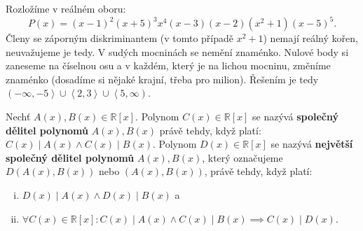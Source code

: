 \begin{reseni}
Rozložíme v reálném oboru:
\begin{equation*}
P(x)=(x-1)^2(x+5)^3x^4(x-3)(x-2)(x^2+1)(x-5)^5.
\end{equation*}
Členy se záporným diskriminantem (v tomto případě $x^2+1$) nemají reálný kořen,
neuvažujeme je tedy. V sudých mocninách se nemění znaménko. Nulové body si zaneseme
na číselnou osu a v každém, který je na lichou mocninu, změníme znaménko (dosadíme si nějaké
krajní, třeba pro milion). Řešením je tedy $\left( -\infty,-5 \right >\cup \left < 2,3 \right > \cup \left < 5,\infty \right )  $.
\end{reseni}

\begin{definition}
  Nechť $A(x), B(x) \in \mathbb R [x]$. Polynom $C(x) \in \mathbb R [x]$ se nazývá \textbf{společný dělitel polynomů} $A(x), B(x)$
  právě tehdy, když platí: $C(x) \mid A(x) \land C(x) \mid B(x)$.
  Polynom $D(x) \in \mathbb R [x]$ se nazývá \textbf{největší společný dělitel polynomů} $A(x), B(x)$, který označujeme $D(A(x), B(x))$ nebo $(A(x), B(x))$, právě tehdy, když platí:
  \begin{enumerate}[i.]
    \item $D(x) \mid A(x) \land D(x) \mid B(x)$ a
    \item $\forall C(x) \in \mathbb R [x]: C(x) \mid A(x) \land C(x) \mid B(x) \implies C(x) \mid D(x).$
  \end{enumerate}
\end{definition}

